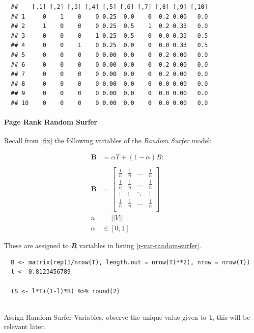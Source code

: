 \documentclass[11pt]{article}
\begin{document}
\begin{verbatim}
  ##    [,1] [,2] [,3] [,4] [,5] [,6] [,7] [,8] [,9] [,10]
  ## 1     0    1    0    0 0.25  0.0    0  0.2 0.00   0.0
  ## 2     1    0    0    0 0.25  0.5    1  0.2 0.33   0.0
  ## 3     0    0    0    1 0.25  0.5    0  0.0 0.33   0.5
  ## 4     0    0    1    0 0.25  0.0    0  0.0 0.33   0.5
  ## 5     0    0    0    0 0.00  0.0    0  0.2 0.00   0.0
  ## 6     0    0    0    0 0.00  0.0    0  0.2 0.00   0.0
  ## 7     0    0    0    0 0.00  0.0    0  0.2 0.00   0.0
  ## 8     0    0    0    0 0.00  0.0    0  0.0 0.00   0.0
  ## 9     0    0    0    0 0.00  0.0    0  0.0 0.00   0.0
  ## 10    0    0    0    0 0.00  0.0    0  0.0 0.00   0.0
\end{verbatim}

\paragraph{Page Rank Random Surfer}
\label{page-rank-random-surfer}
Recall from \ref{fix} the following variables of the \emph{Random Surfer} model:


\begin{align}
    \mathbf{B} &= \alpha T +  \left( 1- \alpha \right)B :\\
\ \\
    \mathbf{B}&= \begin{bmatrix}
    \frac{1}{n} & \frac{1}{n} & \ldots & \frac{1}{n} \\
    \frac{1}{n} & \frac{1}{n} & \ldots & \frac{1}{n} \\
        \vdots      & \vdots      & \ddots & \vdots  \\
    \frac{1}{n} & \frac{1}{n} & \ldots & \frac{1}{n} \\
    \end{bmatrix} \label{eq:bgval1} \\
    n&= \left| \left| V \right| \right| \\
    \alpha &\in [0,1]
\end{align}

These are
assigned to \emph{\textbf{R}} variables in listing \ref{r-var-random-surfer}.

\begin{listing}[htbp]
\begin{verbatim}
  B <- matrix(rep(1/nrow(T), length.out = nrow(T)**2), nrow = nrow(T))
  l <- 0.8123456789

  (S <- l*T+(1-l)*B) %>% round(2)


\end{verbatim}
\caption{\label{r-var-random-surfer}Assign Random Surfer Variables, observe the unique value given to \texttt{l}, this will be relevant later.}
\end{listing}
\end{document}
